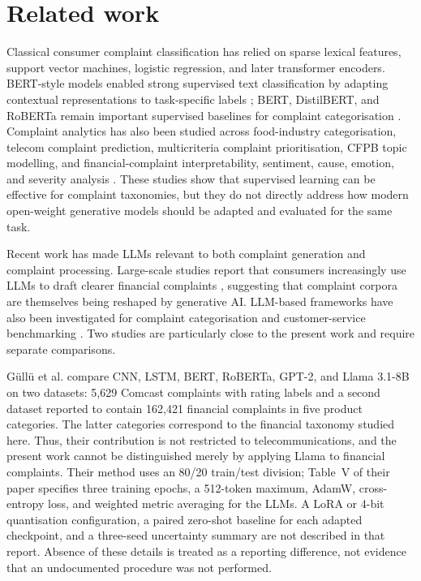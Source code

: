 \documentclass{elektr}
\begin{document}
\section{Related work}

Classical consumer complaint classification has relied on sparse lexical features, support vector machines, logistic regression, and later transformer encoders. BERT-style models enabled strong supervised text classification by adapting contextual representations to task-specific labels \cite{devlin2019bert}; BERT, DistilBERT, and RoBERTa remain important supervised baselines for complaint categorisation \cite{devlin2019bert,sanh2019distilbert,liu2019roberta,sy2024beyondbert}. Complaint analytics has also been studied across food-industry categorisation, telecom complaint prediction, multicriteria complaint prioritisation, CFPB topic modelling, and financial-complaint interpretability, sentiment, cause, emotion, and severity analysis \cite{bozyigit2022foodcomplaints,gewaly2024telecomcomplaint,vairetti2024complaintpriority,raju2022cfpbtopic,das2024negative}. These studies show that supervised learning can be effective for complaint taxonomies, but they do not directly address how modern open-weight generative models should be adapted and evaluated for the same task.

Recent work has made LLMs relevant to both complaint generation and complaint processing. Large-scale studies report that consumers increasingly use LLMs to draft clearer financial complaints \cite{shin2025adoption,liang2025widespread}, suggesting that complaint corpora are themselves being reshaped by generative AI. LLM-based frameworks have also been investigated for complaint categorisation and customer-service benchmarking \cite{yuan2024framework,li2025teleeval}. Two studies are particularly close to the present work and require separate comparisons.

G\"ull\"u et al. \cite{gullu2025complaintllm} compare CNN, LSTM, BERT, RoBERTa, GPT-2, and Llama 3.1-8B on two datasets: 5,629 Comcast complaints with rating labels and a second dataset reported to contain 162,421 financial complaints in five product categories. The latter categories correspond to the financial taxonomy studied here. Thus, their contribution is not restricted to telecommunications, and the present work cannot be distinguished merely by applying Llama to financial complaints. Their method uses an 80/20 train/test division; Table~V of their paper specifies three training epochs, a 512-token maximum, AdamW, cross-entropy loss, and weighted metric averaging for the LLMs. A LoRA or 4-bit quantisation configuration, a paired zero-shot baseline for each adapted checkpoint, and a three-seed uncertainty summary are not described in that report. Absence of these details is treated as a reporting difference, not evidence that an undocumented procedure was not performed.
\end{document}
